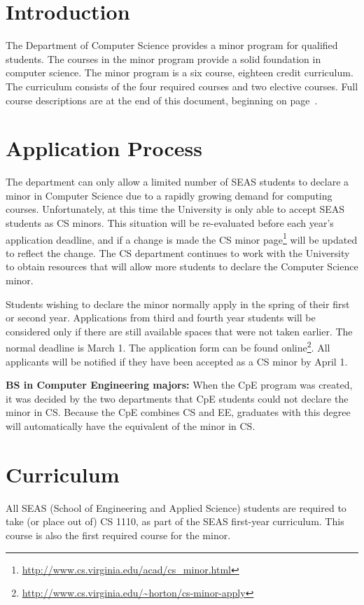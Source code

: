 \documentclass[10pt,letter]{book}
\newcommand{\mysection}[1]{\section{#1}\renewcommand{\rightmark}{#1}}
\newcommand{\myurl}[1]{\footnote{\scriptsize\url{#1}}}
\begin{document}
\mysection{Introduction}

The Department of Computer Science provides a minor program for
qualified students. The courses in the minor program provide a solid
foundation in computer science. The minor program is a six course,
eighteen credit curriculum. The curriculum consists of the four
required courses and two elective courses. Full course descriptions
are at the end of this document, beginning on
page~\pageref{sec:coursedesc}.

 
\mysection{Application Process}


The department can only allow a limited number of SEAS students to
declare a minor in Computer Science due to a rapidly growing demand
for computing courses.  Unfortunately, at this time the University is
only able to accept SEAS students as CS minors. This situation will be
re-evaluated before each year's application deadline, and if a change
is made the CS minor
page\myurl{http://www.cs.virginia.edu/acad/cs_minor.html} will be
updated to reflect the change. The CS department continues to work
with the University to obtain resources that will allow more students
to declare the Computer Science minor.

Students wishing to declare the minor normally apply in the spring of
their first or second year. Applications from third and fourth year
students will be considered only if there are still available spaces
that were not taken earlier. The normal deadline is March 1. The
application form can be found
online\myurl{http://www.cs.virginia.edu/~horton/cs-minor-apply}.  All
applicants will be notified if they have been accepted as a CS minor
by April 1.

{\bf BS in Computer Engineering majors:} When the CpE program was created,
it was decided by the two departments that CpE students could not
declare the minor in CS. Because the CpE combines CS and EE, graduates
with this degree will automatically have the equivalent of the minor
in CS.

\mysection{Curriculum}

All SEAS (School of Engineering and Applied Science) students are
required to take (or place out of) CS 1110, as part of the SEAS
first-year curriculum. This course is also the first required course
for the minor.
\end{document}
